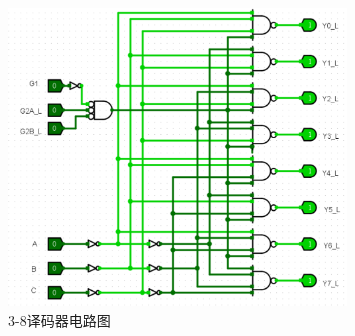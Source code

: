 \documentclass{article}
\begin{document}
    \begin{figure}[H]
    \centering
    \includegraphics[width=0.8\textwidth]{1.4.2.png}
    \caption{3-8译码器电路图}
    \end{figure}
\end{document}
